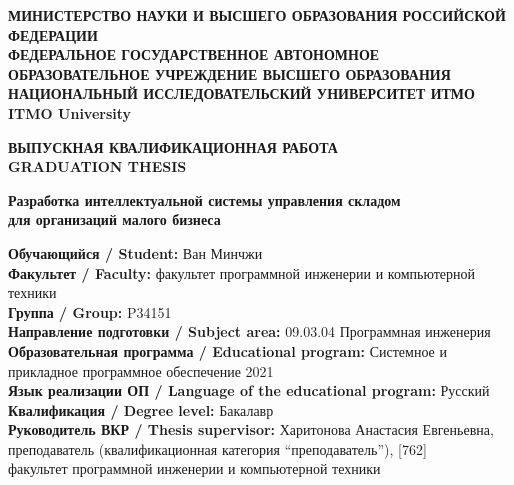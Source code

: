 \documentclass[12pt]{article}
\begin{document}

\begin{titlepage}
\begin{center}
\onehalfspacing
\textbf{\MakeUppercase{Министерство науки и высшего образования Российской Федерации}}\\[0.5em]
\textbf{ФЕДЕРАЛЬНОЕ ГОСУДАРСТВЕННОЕ АВТОНОМНОЕ\\
ОБРАЗОВАТЕЛЬНОЕ УЧРЕЖДЕНИЕ ВЫСШЕГО ОБРАЗОВАНИЯ}\\[0.5em]
\textbf{НАЦИОНАЛЬНЫЙ ИССЛЕДОВАТЕЛЬСКИЙ УНИВЕРСИТЕТ ИТМО}\\[0.5em]
\textbf{ITMO University}
\vfill

\textbf{\Large ВЫПУСКНАЯ КВАЛИФИКАЦИОННАЯ РАБОТА}\\[0.5em]
\textbf{\Large GRADUATION THESIS}
\vfill

\begin{spacing}{1.2}
\textbf{Разработка интеллектуальной системы управления складом\\ для организаций малого бизнеса}
\end{spacing}
\vfill

\end{center}

\begin{flushleft}
\textbf{Обучающийся / Student:} Ван Минчжи\\[0.5em]
\textbf{Факультет / Faculty:} факультет программной инженерии и компьютерной техники\\[0.5em]
\textbf{Группа / Group:} P34151\\[0.5em]
\textbf{Направление подготовки / Subject area:} 09.03.04 Программная инженерия\\[0.5em]
\textbf{Образовательная программа / Educational program:} Системное и прикладное программное обеспечение 2021\\[0.5em]
\textbf{Язык реализации ОП / Language of the educational program:} Русский\\[0.5em]
\textbf{Квалификация / Degree level:} Бакалавр\\[0.5em]
\textbf{Руководитель ВКР / Thesis supervisor:} Харитонова Анастасия Евгеньевна,\\
преподаватель (квалификационная категория ``преподаватель''), [762]\\
факультет программной инженерии и компьютерной техники
\end{flushleft}
\vfill



\end{titlepage}
\end{document}
